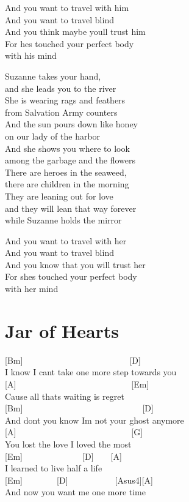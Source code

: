\documentclass[
  letterpaper,
]{scrbook}
\begin{document}
And you want to travel with him\\
And you want to travel blind\\
And you think maybe you\textquotesingle ll trust him\\
For he\textquotesingle s touched your perfect body\\
with his mind

Suzanne takes your hand,\\
and she leads you to the river~~~\\
She is wearing rags and feathers\\
from Salvation Army counters\\
And the sun pours down like honey\\
on our lady of the harbor\\
And she shows you where to look\\
among the garbage and the flowers\\
There are heroes in the seaweed,\\
there are children in the morning~~~~\\
They are leaning out for love\\
and they will lean that way forever~~~\\
while Suzanne holds the mirror

And you want to travel with her\\
And you want to travel blind\\
And you know that you will trust her\\
For she\textquotesingle s touched your perfect body\\
with her mind

\hypertarget{jar-of-hearts}{%
\chapter{Jar of Hearts}\label{jar-of-hearts}}

{[}Bm{]}~~~~~~~~~~~~~~~~~~~~~~~~~{[}D{]}\\
I know I can\textquotesingle t take one more step towards you\\
{[}A{]}~~~~~~~~~~~~~~~~~~~~~~~~~~~{[}Em{]}\\
\textquotesingle Cause all thats waiting is regret\\
{[}Bm{]}~~~~~~~~~~~~~~~~~~~~~~~~~~~~{[}D{]}\\
And don\textquotesingle t you know I\textquotesingle m not your ghost
anymore\\
{[}A{]}~~~~~~~~~~~~~~~~~~~~~~~~~~~{[}G{]}\\
You lost the love I loved the most\\
{[}Em{]}~~~~~~~~~~~~~~{[}D{]}~~~~{[}A{]}\\
I learned to live half a life\\
{[}Em{]}~~~~~~~~{[}D{]}~~~~~~~~~~~{[}Asus4{]}{[}A{]}\\
And now you want me one more time
\end{document}
